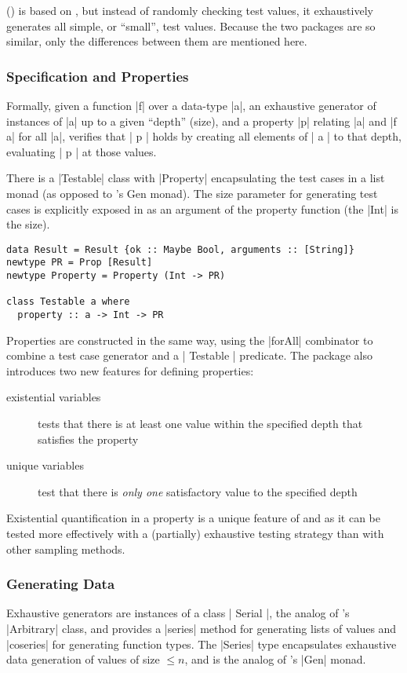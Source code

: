 \SC (\citep{Runcimanetal2008})  is based on \QC, 
but instead of randomly checking test values,
it exhaustively generates all simple, or ``small'', test values.
Because the two packages are so similar,
only the differences between them are mentioned here.

\subsubsection{Specification and Properties}
Formally, given a function |f| over a data-type |a|,
an exhaustive generator of instances of |a| up to a given ``depth'' (size), 
and a property |p| relating |a| and |f a| for all |a|,  
\SC verifies that | p | holds by creating all elements of | a | to that depth, evaluating | p | at those values.

There is a |Testable| class with |Property| encapsulating the test cases in a list monad
(as opposed to \QC's Gen monad).
The size parameter for generating test cases is explicitly exposed in \SC
as an argument of the property function (the |Int| is the size).

\begin{lstlisting}
data Result = Result {ok :: Maybe Bool, arguments :: [String]}
newtype PR = Prop [Result]
newtype Property = Property (Int -> PR)
	
class Testable a where
  property :: a -> Int -> PR

\end{lstlisting}

Properties are constructed in the same way,
using the |forAll| combinator to combine a test case generator and a | Testable | predicate.
The \SC package also introduces two new features for defining properties:

\begin{description}
\item [existential variables] tests that there is at least one value
within the specified depth that satisfies the property
\item [unique variables] test that there is \emph{only one} satisfactory value to the specified depth
\end{description}

\noindent Existential quantification in a property is a unique feature of \SC and \GAST as
it can be tested more effectively with a (partially) exhaustive testing strategy than 
with other sampling methods.

\subsubsection{Generating Data}
Exhaustive generators are instances of a class | Serial |, 
the analog of \QC 's |Arbitrary| class,
and provides a |series| method for generating lists of values
and |coseries| for generating function types.
The |Series| type encapsulates exhaustive data generation
of values of size $\leq n$, and is the analog of \QC's |Gen| monad.

